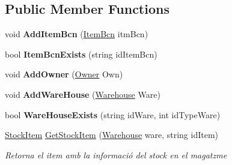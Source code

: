 \subsection*{Public Member Functions}
\begin{DoxyCompactItemize}
\item 
\mbox{\label{class_h_k_supply_1_1_p_r_j___stocks_1_1_classes_1_1_stocks_ad5efe212971f8e2035dd7ba2ca431e15}} 
void {\bfseries Add\+Item\+Bcn} (\mbox{\hyperlink{class_h_k_supply_1_1_p_r_j___stocks_1_1_classes_1_1_stocks_1_1_item_bcn}{Item\+Bcn}} itm\+Bcn)
\item 
\mbox{\label{class_h_k_supply_1_1_p_r_j___stocks_1_1_classes_1_1_stocks_a353faac2877a1de177ef3c338e27de2f}} 
bool {\bfseries Item\+Bcn\+Exists} (string id\+Item\+Bcn)
\item 
\mbox{\label{class_h_k_supply_1_1_p_r_j___stocks_1_1_classes_1_1_stocks_a2d4dd80c6d8f430b38f840fb0118b24a}} 
void {\bfseries Add\+Owner} (\mbox{\hyperlink{class_h_k_supply_1_1_p_r_j___stocks_1_1_classes_1_1_stocks_1_1_owner}{Owner}} Own)
\item 
\mbox{\label{class_h_k_supply_1_1_p_r_j___stocks_1_1_classes_1_1_stocks_a8fc20b842605474fbf9949c550951049}} 
void {\bfseries Add\+Ware\+House} (\mbox{\hyperlink{class_h_k_supply_1_1_p_r_j___stocks_1_1_classes_1_1_stocks_1_1_warehouse}{Warehouse}} Ware)
\item 
\mbox{\label{class_h_k_supply_1_1_p_r_j___stocks_1_1_classes_1_1_stocks_a874f3df18d2530aafa61367e24ec9966}} 
bool {\bfseries Ware\+House\+Exists} (string id\+Ware, int id\+Type\+Ware)
\item 
\mbox{\hyperlink{class_h_k_supply_1_1_p_r_j___stocks_1_1_classes_1_1_stocks_1_1_stock_item}{Stock\+Item}} \mbox{\hyperlink{class_h_k_supply_1_1_p_r_j___stocks_1_1_classes_1_1_stocks_ae482ad0dc6d9a62c330f1e929a49666b}{Get\+Stock\+Item}} (\mbox{\hyperlink{class_h_k_supply_1_1_p_r_j___stocks_1_1_classes_1_1_stocks_1_1_warehouse}{Warehouse}} ware, string id\+Item)
\begin{DoxyCompactList}\small\item\em Retorna el item amb la informació del stock en el magatzme \end{DoxyCompactList}\item 

\end{DoxyCompactItemize}
